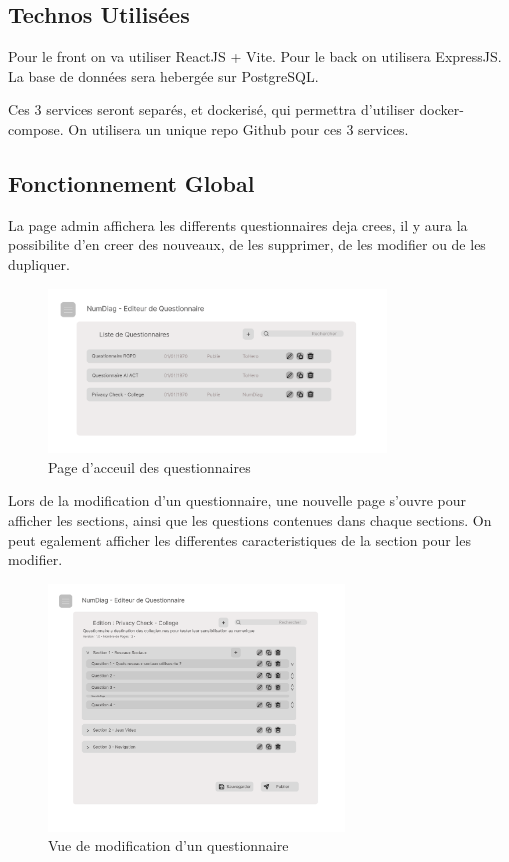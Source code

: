 \documentclass{extarticle}
\begin{document}
\subsection{Technos Utilisées}
Pour le front on va utiliser ReactJS + Vite.
Pour le back on utilisera ExpressJS. La base de données sera hebergée sur PostgreSQL.

Ces 3 services seront separés, et dockerisé, qui permettra d'utiliser docker-compose. 
On utilisera un unique repo Github pour ces 3 services.

\subsection{Fonctionnement Global}
La page admin affichera les differents questionnaires deja crees, il y aura la possibilite d'en creer des nouveaux, de les supprimer, de les modifier ou de les dupliquer.

\begin{figure}[h]
    \centering
    \includegraphics[width=0.8\textwidth]{adminVue.png}
    \caption{Page d'acceuil des questionnaires}
    \label{fig:AdminQuestionnaire}
\end{figure}

Lors de la modification d'un questionnaire, une nouvelle page s'ouvre pour afficher les sections, ainsi que les questions contenues dans chaque sections. On peut egalement afficher les differentes caracteristiques de la section pour les modifier.

\begin{figure}[h]
    \centering
    \includegraphics[width=0.7\textwidth]{questionnaireVue.png}
    \caption{Vue de modification d'un questionnaire}
    \label{fig:EditQuestionnaire}
\end{figure}
\end{document}
